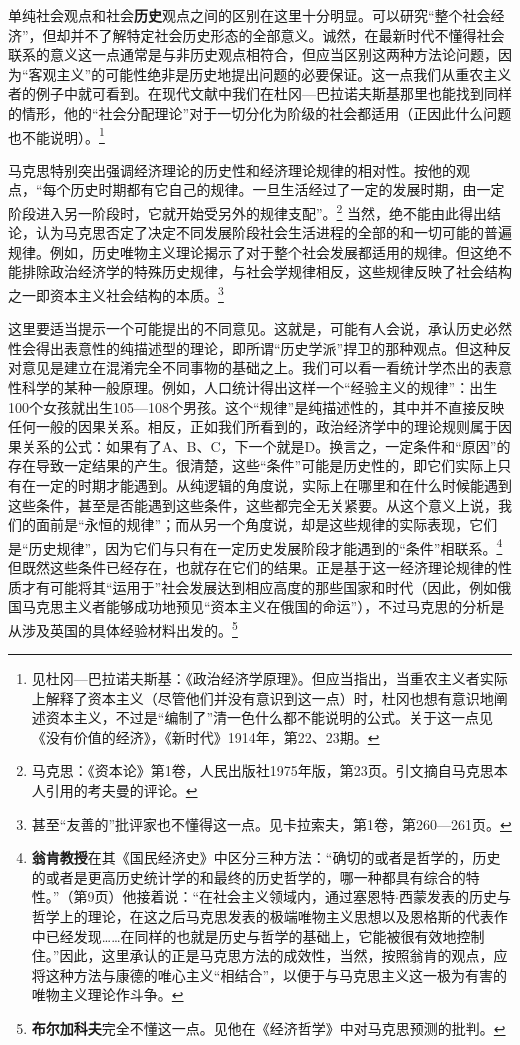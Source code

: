 \documentclass[fontset=fandol, a4paper, 12pt, openright]{ctexbook}
\begin{document}
单纯社会观点和社会\textbf{历史}观点之间的区别在这里十分明显。可以研究“整个社会经济”，但却并不了解特定社会历史形态的全部意义。诚然，在最新时代不懂得社会联系的意义这一点通常是与非历史观点相符合，但应当区别这两种方法论问题，因为“客观主义”的可能性绝非是历史地提出问题的必要保证。这一点我们从重农主义者的例子中就可看到。在现代文献中我们在杜冈—巴拉诺夫斯基那里也能找到同样的情形，他的“社会分配理论”对于一切分化为阶级的社会都适用（正因此什么问题也不能说明）。\footnote{见杜冈—巴拉诺夫斯基：《政治经济学原理》。但应当指出，当重农主义者实际上解释了资本主义（尽管他们并没有意识到这一点）时，杜冈也想有意识地阐述资本主义，不过是“编制了”清一色什么都不能说明的公式。关于这一点见《没有价值的经济》，《新时代》1914年，第22、23期。}

马克思特别突出强调经济理论的历史性和经济理论规律的相对性。按他的观点，“每个历史时期都有它自己的规律。一旦生活经过了一定的发展时期，由一定阶段进入另一阶段时，它就开始受另外的规律支配”。\footnote{马克思：《资本论》第1卷，人民出版社1975年版，第23页。引文摘自马克思本人引用的考夫曼的评论。} 当然，绝不能由此得出结论，认为马克思否定了决定不同发展阶段社会生活进程的全部的和一切可能的普遍规律。例如，历史唯物主义理论揭示了对于整个社会发展都适用的规律。但这绝不能排除政治经济学的特殊历史规律，与社会学规律相反，这些规律反映了社会结构之一即资本主义社会结构的本质。\footnote{甚至“友善的”批评家也不懂得这一点。见卡拉索夫，第1卷，第260—261页。}

这里要适当提示一个可能提出的不同意见。这就是，可能有人会说，承认历史必然性会得出表意性的纯描述型的理论，即所谓“历史学派”捍卫的那种观点。但这种反对意见是建立在混淆完全不同事物的基础之上。我们可以看一看统计学杰出的表意性科学的某种一般原理。例如，人口统计得出这样一个“经验主义的规律”：出生100个女孩就出生105—108个男孩。这个“规律”是纯描述性的，其中并不直接反映任何一般的因果关系。相反，正如我们所看到的，政治经济学中的理论规则属于因果关系的公式：如果有了A、B、C，下一个就是D。换言之，一定条件和“原因”的存在导致一定结果的产生。很清楚，这些“条件”可能是历史性的，即它们实际上只有在一定的时期才能遇到。从纯逻辑的角度说，实际上在哪里和在什么时候能遇到这些条件，甚至是否能遇到这些条件，这些都完全无关紧要。从这个意义上说，我们的面前是“永恒的规律”；而从另一个角度说，却是这些规律的实际表现，它们是“历史规律”，因为它们与只有在一定历史发展阶段才能遇到的“条件”相联系。\footnote{\textbf{翁肯教授}在其《国民经济史》中区分三种方法：“确切的或者是哲学的，历史的或者是更高历史统计学的和最终的历史哲学的，哪一种都具有综合的特性。”（第9页）他接着说：“在社会主义领域内，通过塞恩特$\cdot$西蒙发表的历史与哲学上的理论，在这之后马克思发表的极端唯物主义思想以及恩格斯的代表作中已经发现……在同样的也就是历史与哲学的基础上，它能被很有效地控制住。”因此，这里承认的正是马克思方法的成效性，当然，按照翁肯的观点，应将这种方法与康德的唯心主义“相结合”，以便于与马克思主义这一极为有害的唯物主义理论作斗争。} 但既然这些条件已经存在，也就存在它们的结果。正是基于这一经济理论规律的性质才有可能将其“运用于”社会发展达到相应高度的那些国家和时代（因此，例如俄国马克思主义者能够成功地预见“资本主义在俄国的命运”），不过马克思的分析是从涉及英国的具体经验材料出发的。\footnote{\textbf{布尔加科夫}完全不懂这一点。见他在《经济哲学》中对马克思预测的批判。}
\end{document}
